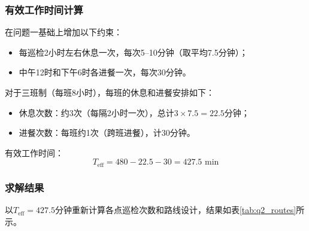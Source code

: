 \documentclass[12pt,a4paper]{article}
\begin{document}
\subsubsection{有效工作时间计算}

在问题一基础上增加以下约束：
\begin{itemize}
    \item 每巡检2小时左右休息一次，每次5--10分钟（取平均7.5分钟）；
    \item 中午12时和下午6时各进餐一次，每次30分钟。
\end{itemize}

对于三班制（每班8小时），每班的休息和进餐安排如下：
\begin{itemize}
    \item 休息次数：约3次（每隔2小时一次），总计$3 \times 7.5 = 22.5$分钟；
    \item 进餐次数：每班约1次（跨班进餐），计30分钟。
\end{itemize}

有效工作时间：
\begin{equation}
    T_{\text{eff}} = 480 - 22.5 - 30 = 427.5 \text{ min}
\label{eq:effective_time}
\end{equation}

\subsubsection{求解结果}

以$T_{\text{eff}} = 427.5$分钟重新计算各点巡检次数和路线设计，结果如表\ref{tab:q2_routes}所示。
\end{document}
